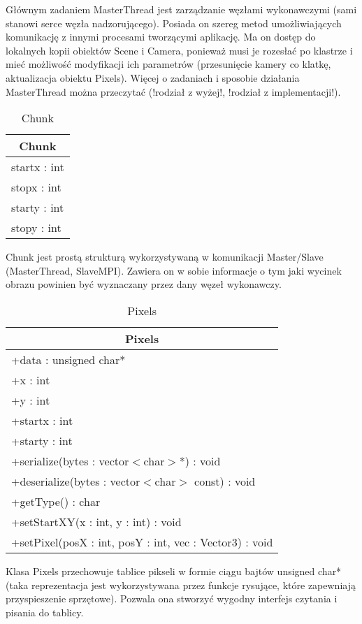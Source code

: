 Głównym zadaniem MasterThread jest zarządzanie węzłami wykonawczymi (sami stanowi serce węzła nadzorującego). Posiada on szereg metod umożliwiających komunikację z innymi procesami tworzącymi aplikację. Ma on dostęp do lokalnych kopii obiektów Scene i Camera, ponieważ musi je rozesłać po klastrze i mieć możliwość modyfikacji ich parametrów (przesunięcie kamery co klatkę, aktualizacja obiektu Pixels). Więcej o zadaniach i sposobie działania MasterThread można przeczytać (!rodział z wyżej!, !rodział z implementacji!).

\begin{longtable}{|p{16cm}|}
    \caption{Chunk} \label{tab:Chunk} \\ \hline
    \multicolumn{1}{|c|}{Chunk} \\ \hline
    startx : int \\
    stopx : int \\
    starty : int \\
    stopy : int \\
    \hline
\end{longtable}

Chunk jest prostą strukturą wykorzystywaną w komunikacji Master/Slave (MasterThread, SlaveMPI). Zawiera on w sobie informacje o tym jaki wycinek obrazu powinien być wyznaczany przez dany węzeł wykonawczy.

\begin{longtable}{|p{16cm}|}
    \caption{Pixels} \label{tab:Pixels} \\ \hline
    \multicolumn{1}{|c|}{Pixels} \\ \hline
    +data : unsigned char* \\
    +x : int \\
    +y : int \\ 
    +startx : int \\
    +starty : int \\
    \hline
	+serialize(bytes : vector$<$char$>$*) : void \\
	+deserialize(bytes : vector$<$char$>$ const) : void \\
	+getType() : char \\
	+setStartXY(x : int, y : int) : void \\
	+setPixel(posX : int, posY : int, vec : Vector3) : void \\
	\hline
\end{longtable}

Klasa Pixels przechowuje tablice pikseli w formie ciągu bajtów unsigned char* (taka reprezentacja jest wykorzystywana przez funkcje rysujące, które zapewniają przyspieszenie sprzętowe). Pozwala ona stworzyć wygodny interfejs czytania i pisania do tablicy. 

